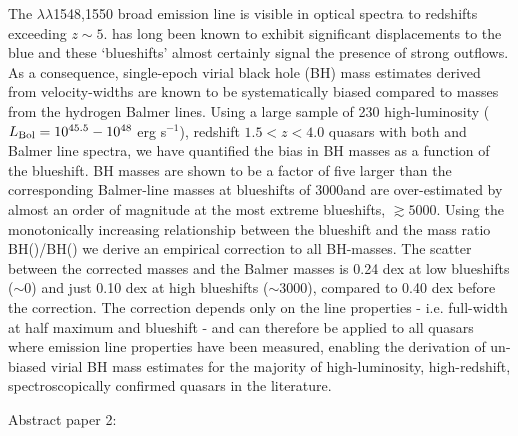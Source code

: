 The $\lambda\lambda$1548,1550 broad emission line is visible in optical spectra to redshifts exceeding $z\sim5$. 
 has long been known to exhibit significant displacements to the blue and these `blueshifts' almost certainly signal the presence of strong outflows.
As a consequence, single-epoch virial black hole (BH) mass estimates derived from  velocity-widths are known to be systematically biased compared to masses from the hydrogen Balmer lines. 
Using a large sample of 230 high-luminosity ($L_{\rm Bol} = 10^{45.5}-10^{48}$ erg s$^{-1}$), redshift $1.5 < z < 4.0$ quasars with both  and Balmer line spectra, we have quantified the bias in  BH masses as a function of the  blueshift. 
 BH masses are shown to be a factor of five larger than the corresponding Balmer-line masses at  blueshifts of 3000\kms and are over-estimated by almost an order of magnitude at the most extreme blueshifts, $\gtrsim 5000$\kms.
Using the monotonically increasing relationship between the  blueshift and the mass ratio BH()/BH(\hans) we derive an empirical correction to all  BH-masses.
The scatter between the corrected  masses and the Balmer masses is 0.24 dex at low  blueshifts ($\sim$0\kms) and just 0.10 dex at high blueshifts ($\sim$3000\kms), compared to 0.40 dex before the correction. 
The correction depends only on the  line properties - i.e. full-width at half maximum and blueshift - and can therefore be applied to all quasars where  emission line properties have been measured, enabling the derivation of un-biased virial BH mass estimates for the majority of high-luminosity, high-redshift, spectroscopically confirmed quasars in the literature. 

Abstract paper 2: 

